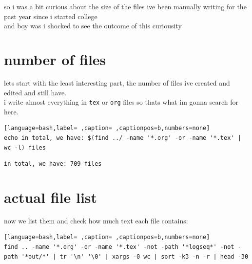 \documentclass[a4paper,12pt]{article}
\newcommand{\?}{\stackrel{?}{=}}
\begin{document}
\newenvironment{note}
  {\begin{bclogo}[logo=\bcinfo, couleurBarre=orange, couleur=lightgray]{ note}}
  {\end{bclogo}}
\newenvironment{attention}
  {\begin{bclogo}[logo=\bcattention, couleurBarre=red, noborder=true, 
                couleur=red!15]{Important!}}
  {\end{bclogo}}

so i was a bit curious about the size of the files ive been manually writing for the past year since i started college\\[0pt]
and boy was i shocked to see the outcome of this curiousity\\[0pt]
\section{number of files}
\label{sec:org755c064}
lets start with the least interesting part, the number of files ive created and edited and still have.\\[0pt]
i write almost everything in \texttt{tex} or \texttt{org} files so thats what im gonna search for here.\\[0pt]
\begin{lstlisting}[language=bash,label= ,caption= ,captionpos=b,numbers=none]
echo in total, we have: $(find ../ -name '*.org' -or -name '*.tex' | wc -l) files
\end{lstlisting}

\begin{verbatim}
in total, we have: 709 files
\end{verbatim}
\section{actual file list}
\label{sec:org12974fe}
now we list them and check how much text each file contains:\\[0pt]
\begin{lstlisting}[language=bash,label= ,caption= ,captionpos=b,numbers=none]
find .. -name '*.org' -or -name '*.tex' -not -path '*logseq*' -not -path '*out/*' | tr '\n' '\0' | xargs -0 wc | sort -k3 -n -r | head -30
\end{lstlisting}
\end{document}
